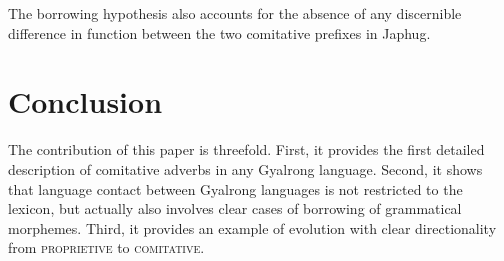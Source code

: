 \documentclass[oldfontcommands,oneside,a4paper,11pt]{article}
\begin{document}
The borrowing hypothesis also accounts for the absence of any discernible difference in function between the two comitative prefixes in Japhug.

\section*{Conclusion} 
The contribution of this paper is threefold. First, it provides the first detailed description of comitative adverbs in any Gyalrong language. Second, it shows that language contact between Gyalrong languages is not restricted to the lexicon, but actually also involves clear cases of borrowing of grammatical morphemes. Third, it provides an example of evolution with clear directionality from \textsc{proprietive} to \textsc{comitative}.



\end{document}
